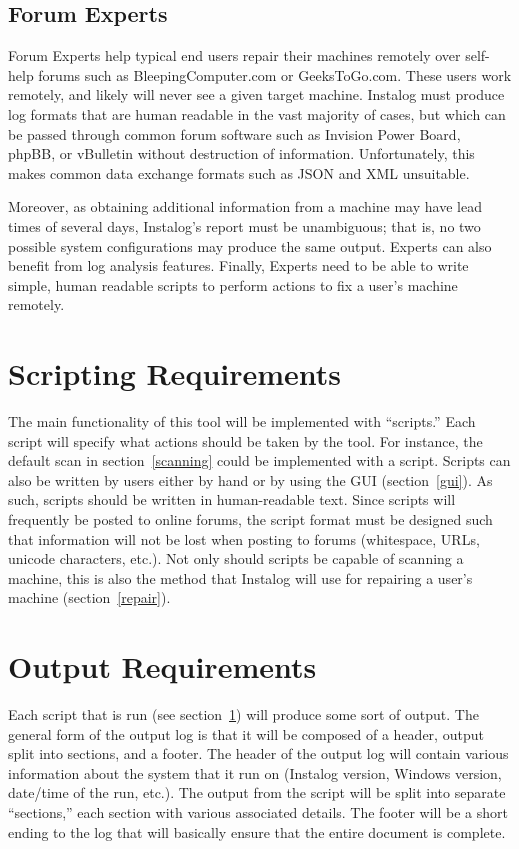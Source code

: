 \documentclass[letterpaper,12pt]{article}
\begin{document}
\subsection{Forum Experts}
Forum Experts help typical end users repair their machines remotely over
self-help forums such as BleepingComputer.com or GeeksToGo.com.
These users work remotely, and likely will never see a given target
machine.
Instalog must produce log formats that are human readable in the vast majority
of cases, but which can be passed through common forum software such as Invision
Power Board, phpBB, or vBulletin without destruction of information.
Unfortunately, this makes common data exchange formats such as JSON and XML
unsuitable. 

Moreover, as obtaining additional information from a machine may
have lead times of several days, Instalog's report must be unambiguous; that is,
no two possible system configurations may produce the same output. Experts can
also benefit from log analysis features. Finally, Experts need to be able to
write simple, human readable scripts to perform actions to fix a user's machine
remotely.

\newpage



\section{Scripting Requirements} \label{scripting}
The main functionality of this tool will be implemented with ``scripts.''  Each
script will specify what actions should be taken by the tool.  For instance, the
default scan in section~\ref{scanning} could be implemented with a script. 
Scripts can also be written by users either by hand or by using the GUI
(section~\ref{gui}).  As such, scripts should be written in human-readable text.
Since scripts will frequently be posted to online forums, the script format must
be designed such that information will not be lost when posting to forums
(whitespace, URLs, unicode characters, etc.).  Not only should scripts be
capable of scanning a machine, this is also the method that Instalog will use
for repairing a user's machine (section~\ref{repair}).

\newpage



\section{Output Requirements} \label{output}
Each script that is run (see section~\ref{scripting}) will produce some sort of
output.  The general form of the output log is that it will be composed of a
header, output split into sections, and a footer. The header of the output log
will contain various information about the system that it run on (Instalog
version, Windows version, date/time of the run, etc.). The output from the
script will be split into separate ``sections,'' each section with various
associated details.  The footer will be a short ending to the log that will
basically ensure that the entire document is complete.  
\end{document}
